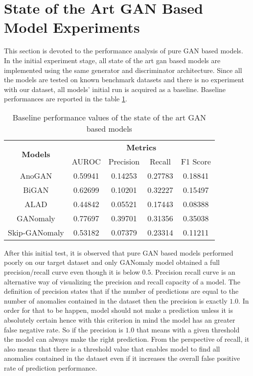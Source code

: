 \section{State of the Art GAN Based Model Experiments}
\label{sec:exp_pure_gan}
This section is devoted to the performance analysis of pure GAN based models. In the initial experiment stage, all state of the art gan 
based models are implemented using the same generator and discriminator architecture. Since all the models are tested on known benchmark 
datasets and there is no experiment with our dataset, all models' initial run is acquired as a baseline. Baseline performances 
are reported in the table \ref{tab:exp_baseline}.

\begin{longtable}[c]{|c|cccc|}
	\caption{Baseline performance values of the state of the art GAN based models}
	\label{tab:exp_baseline}\\
	\hline
	\multirow{2}{*}{\textbf{Models}} & \multicolumn{4}{c|}{\textbf{Metrics}} \\ \cline{2-5} 
	& AUROC & Precision & Recall & F1 Score \\ \hline
	\endhead
 \multicolumn{1}{|c|}{AnoGAN} & \multicolumn{1}{c}{0.59941} & \multicolumn{1}{c}{0.14253} & \multicolumn{1}{c}{0.27783} & \multicolumn{1}{c|}{0.18841} \\ \hline
\multicolumn{1}{|c|}{BiGAN} & \multicolumn{1}{c}{0.62699} & \multicolumn{1}{c}{0.10201} & \multicolumn{1}{c}{0.32227} & \multicolumn{1}{c|}{0.15497} \\ \hline
\multicolumn{1}{|c|}{ALAD} & \multicolumn{1}{c}{0.44842} & \multicolumn{1}{c}{0.05521} & \multicolumn{1}{c}{0.17443} & \multicolumn{1}{c|}{0.08388} \\ \hline
\multicolumn{1}{|c|}{GANomaly} & \multicolumn{1}{c}{0.77697} & \multicolumn{1}{c}{0.39701} & \multicolumn{1}{c}{0.31356} & \multicolumn{1}{c|}{0.35038} \\ \hline
\multicolumn{1}{|c|}{Skip-GANomaly} & \multicolumn{1}{c}{0.53182} & \multicolumn{1}{c}{0.07379} & \multicolumn{1}{c}{0.23314} & \multicolumn{1}{c|}{0.11211} \\ \hline
\end{longtable}

After this initial test, it is observed that pure GAN based models performed poorly on our target dataset and only GANomaly model obtained a 
full precision/recall curve even though it is below $0.5$. Precision recall curve is an alternative way of visualizing the precision and recall capacity 
of a model. The definition of precision states that if the number of predictions are equal to the number of anomalies contained in the dataset then the 
precision is exactly $1.0$. In order for that to be happen, model should not make a prediction unless it is absolutely certain hence with this criterion in mind 
the model has an greater false negative rate. So if the precision is $1.0$ that means with a given threshold the model can always make the right prediction. 
From the perspective of recall, it also means that there is a threshold value that enables model to find all anomalies contained in the dataset even if it increases 
the overall false positive rate of prediction performance.  

